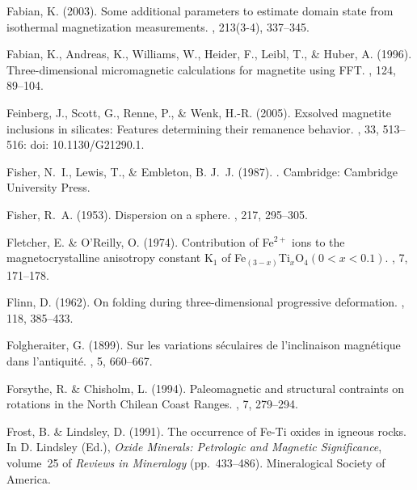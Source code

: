 Fabian, K. (2003).
\newblock Some additional parameters to estimate domain state from isothermal
  magnetization measurements.
, 213(3-4), 337--345.

Fabian, K., Andreas, K., Williams, W., Heider, F., Leibl, T., \& Huber, A.
  (1996).
\newblock Three-dimensional micromagnetic calculations for magnetite using FFT.
, 124, 89--104.

Feinberg, J., Scott, G., Renne, P., \& Wenk, H.-R. (2005).
\newblock Exsolved magnetite inclusions in silicates: Features determining
  their remanence behavior.
, 33, 513--516: doi: 10.1130/G21290.1.

Fisher, N.~I., Lewis, T., \& Embleton, B. J.~J. (1987).
.
\newblock Cambridge: Cambridge University Press.

Fisher, R.~A. (1953).
\newblock Dispersion on a sphere.
, 217, 295--305.

Fletcher, E. \& O'Reilly, O. (1974).
\newblock Contribution of Fe$^{2+}$ ions to the magnetocrystalline anisotropy
  constant K$_1$ of Fe$_{(3-x)}$Ti$_x$O$_4 (0<x<0.1)$.
, 7, 171--178.

Flinn, D. (1962).
\newblock On folding during three-dimensional progressive deformation.
, 118, 385--433.

Folgheraiter, G. (1899).
\newblock Sur les variations s\'eculaires de l'inclinaison magn\'etique dans
  l'antiquit\'e.
, 5, 660--667.

Forsythe, R. \& Chisholm, L. (1994).
\newblock Paleomagnetic and structural contraints on rotations in the North
  Chilean Coast Ranges.
, 7, 279--294.

Frost, B. \& Lindsley, D. (1991).
\newblock The occurrence of Fe-Ti oxides in igneous rocks.
\newblock In D. Lindsley (Ed.), {\em Oxide Minerals: Petrologic and Magnetic
  Significance}, volume~25 of {\em Reviews in Mineralogy}  (pp.\ 433--486).
  Mineralogical Society of America.

